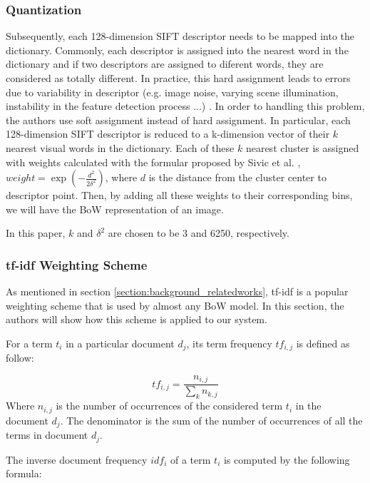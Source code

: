 \subsubsection{Quantization} \label{section:quantization}

Subsequently, each 128-dimension SIFT descriptor needs to be mapped into the dictionary. Commonly, each descriptor is assigned into the nearest word in the dictionary and if two descriptors are assigned to diferent words, they are considered as totally different. In practice, this hard assignment leads to errors due to variability in descriptor (e.g. image noise, varying scene illumination, instability in the feature detection process ...) \cite{7}. In order to handling this problem, the authors use soft assignment instead of hard assignment. In particular, each 128-dimension SIFT descriptor is reduced to a k-dimension vector of their $k$ nearest visual words in the dictionary. Each of these $k$ nearest cluster is assigned with weights calculated with the formular proposed by Sivic et al. \cite{7}, $weight = \exp(-\frac{d^2}{2\delta^2})$, where $d$ is the distance from the cluster center to descriptor point. Then, by adding all these weights to their corresponding bins, we will have the BoW representation of an image.

In this paper, $k$ and $\delta^2$ are chosen to be 3 and 6250, respectively.

\subsubsection{tf-idf Weighting Scheme} \label{section:tfidf_weighting}

As mentioned in section \ref{section:background_relatedworks}, tf-idf is a popular weighting scheme that is used by almost any BoW model. In this section, the authors will show how this scheme is applied to our system.

For a term $t_{i}$ in a particular document $d_{j}$, its term frequency $tf_{i, j}$ is defined as follow:

\begin{equation} 
        tf_{i, j} = \frac{n_{i, j}}{\sum\limits_{k} n_{k, j}}
\end{equation}
Where $n_{i, j}$ is the number of occurrences of the considered term $t_{i}$ in the document $d_{j}$. The denominator is the sum of the number of occurrences of all the terms in document $d_{j}$.

The inverse document frequency $idf_{i}$ of a term $t_{i}$ is computed by the following formula:

